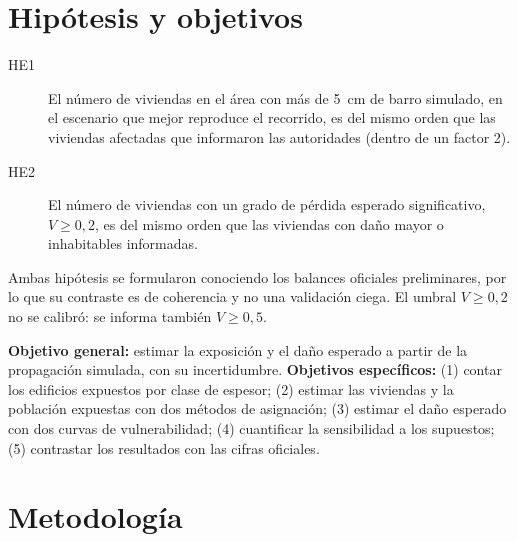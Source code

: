 \documentclass[10pt,a4paper]{article}
\begin{document}
\section{Hipótesis y objetivos}
\begin{description}
\item[HE1] El número de viviendas en el área con más de \SI{5}{cm} de barro simulado, en el escenario que mejor reproduce el recorrido, es del mismo orden que las viviendas afectadas que informaron las autoridades (dentro de un factor 2).
\item[HE2] El número de viviendas con un grado de pérdida esperado significativo, $V\geq0{,}2$, es del mismo orden que las viviendas con daño mayor o inhabitables informadas.
\end{description}
\noindent Ambas hipótesis se formularon conociendo los balances oficiales preliminares, por lo que su contraste es de coherencia y no una validación ciega. El umbral $V\geq0{,}2$ no se calibró: se informa también $V\geq0{,}5$.

\noindent\textbf{Objetivo general:} estimar la exposición y el daño esperado a partir de la propagación simulada, con su incertidumbre. \textbf{Objetivos específicos:} (1) contar los edificios expuestos por clase de espesor; (2) estimar las viviendas y la población expuestas con dos métodos de asignación; (3) estimar el daño esperado con dos curvas de vulnerabilidad; (4) cuantificar la sensibilidad a los supuestos; (5) contrastar los resultados con las cifras oficiales.

\section{Metodología}
\end{document}
